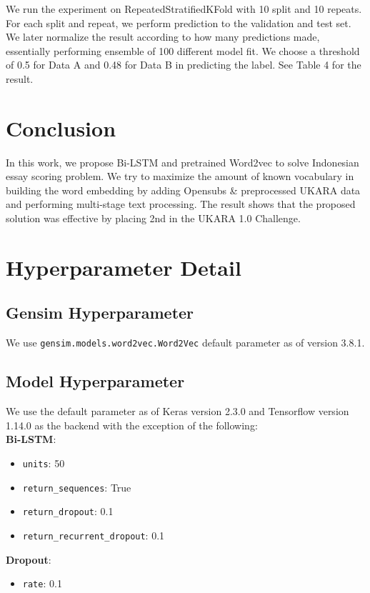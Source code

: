 \documentclass[11pt,a4paper]{article}
\begin{document}
We run the experiment on RepeatedStratifiedKFold with 10 split and 10 repeats. For each split and repeat, we perform prediction to the validation and test set. We later normalize the result according to how many predictions made, essentially performing ensemble of 100 different model fit. We choose a threshold of 0.5 for Data A and 0.48 for Data B in predicting the label. See Table 4 for the result.

\section{Conclusion}

In this work, we propose Bi-LSTM and pretrained Word2vec to solve Indonesian essay scoring problem. We try to maximize the amount of known vocabulary in building the word embedding by adding Opensubs \& preprocessed UKARA data and performing multi-stage text processing. The result shows that the proposed solution was effective by placing 2nd in the UKARA 1.0 Challenge.




\appendix

\section{Hyperparameter Detail}
\subsection{Gensim Hyperparameter}
We use \verb|gensim.models.word2vec.Word2Vec| default parameter as of version 3.8.1.
\subsection{Model Hyperparameter}
We use the default parameter as of Keras version 2.3.0 and Tensorflow version 1.14.0 as the backend with the exception of the following:
\\

\textbf{Bi-LSTM}:
\begin{itemize}
\item \verb|units|: 50
\item \verb|return_sequences|: True
\item \verb|return_dropout|: 0.1
\item \verb|return_recurrent_dropout|: 0.1
\end{itemize}

\textbf{Dropout}:
\begin{itemize}
\item \verb|rate|: 0.1
\end{itemize}
\end{document}
